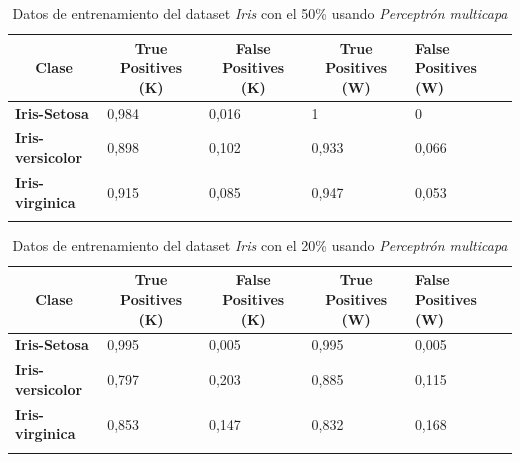 \documentclass[10pt,a4paper]{article}
\begin{document}
\begin{table}[h!]
	\begin{tabular}{lllll}
		\hline
		\multicolumn{1}{|c|}{\textbf{Clase}} & \multicolumn{1}{c|}{\textbf{True Positives (K)}} & \multicolumn{1}{c|}{\textbf{False Positives (K)}} & \multicolumn{1}{c|}{\textbf{True Positives (W)}} & \multicolumn{1}{l|}{\textbf{False Positives (W)}} \\ \hline
		\multicolumn{1}{|l|}{\textbf{Iris-Setosa}} & \multicolumn{1}{l|}{0,984}          & \multicolumn{1}{l|}{0,016}          & \multicolumn{1}{l|}{1}          & \multicolumn{1}{l|}{0} \\ \hline
		\multicolumn{1}{|l|}{\textbf{Iris-versicolor}} & \multicolumn{1}{l|}{0,898}          & \multicolumn{1}{l|}{0,102}          & \multicolumn{1}{l|}{0,933}          & \multicolumn{1}{l|}{0,066} \\ \hline
		\multicolumn{1}{|l|}{\textbf{Iris-virginica}} & \multicolumn{1}{l|}{0,915}          & \multicolumn{1}{l|}{0,085}          & \multicolumn{1}{l|}{0,947}          & \multicolumn{1}{l|}{0,053}\\ \hline
		\textbf{}                       &                                &                                &                                &                      
		
	\end{tabular}
	\caption{Datos de entrenamiento del dataset \emph{Iris} con el 50\% usando \emph{Perceptrón multicapa}}
	\label{tab:iris_percep_50}
\end{table}

\begin{table}[h!]
	\begin{tabular}{lllll}
		\hline
		\multicolumn{1}{|c|}{\textbf{Clase}} & \multicolumn{1}{c|}{\textbf{True Positives (K)}} & \multicolumn{1}{c|}{\textbf{False Positives (K)}} & \multicolumn{1}{c|}{\textbf{True Positives (W)}} & \multicolumn{1}{l|}{\textbf{False Positives (W)}} \\ \hline
		\multicolumn{1}{|l|}{\textbf{Iris-Setosa}} & \multicolumn{1}{l|}{0,995}          & \multicolumn{1}{l|}{0,005}          & \multicolumn{1}{l|}{0,995}          & \multicolumn{1}{l|}{0,005} \\ \hline
		\multicolumn{1}{|l|}{\textbf{Iris-versicolor}} & \multicolumn{1}{l|}{0,797}          & \multicolumn{1}{l|}{0,203}          & \multicolumn{1}{l|}{0,885}          & \multicolumn{1}{l|}{0,115} \\ \hline
		\multicolumn{1}{|l|}{\textbf{Iris-virginica}} & \multicolumn{1}{l|}{0,853}          & \multicolumn{1}{l|}{0,147}          & \multicolumn{1}{l|}{0,832}          & \multicolumn{1}{l|}{0,168}\\ \hline
		\textbf{}                       &                                &                                &                                &                      
		
	\end{tabular}
	\caption{Datos de entrenamiento del dataset \emph{Iris} con el 20\% usando \emph{Perceptrón multicapa}}
	\label{tab:iris_percep_20}
\end{table}
\end{document}
